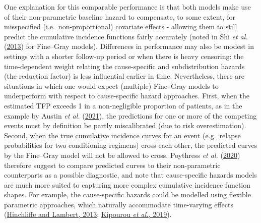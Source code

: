 \documentclass[
  letterpaper,
  DIV=11,
  numbers=noendperiod]{scrreprt}
\begin{document}
One explanation for this comparable performance is that both models make
use of their non-parametric baseline hazard to compensate, to some
extent, for misspecified (i.e.~non-proportional) covariate effects -
allowing them to still predict the cumulative incidence functions fairly
accurately (noted in Shi \emph{et al.}
(\protect\hyperlink{ref-shiConstrainedParametricModel2013}{2013}) for
Fine--Gray models). Differences in performance may also be modest in
settings with a shorter follow-up period or when there is heavy
censoring: the time-dependent weight relating the cause-specific and
subdistribution hazards (the reduction factor) is less influential
earlier in time. Nevertheless, there are situations in which one would
expect (multiple) Fine--Gray models to underperform with respect to
cause-specific hazard approaches. First, when the estimated TFP exceeds
1 in a non-negligible proportion of patients, as in the example by
Austin \emph{et al.}
(\protect\hyperlink{ref-austinFineGraySubdistributionHazard2021}{2021}),
the predictions for one or more of the competing events must by
definition be partly miscalibrated (due to risk overestimation). Second,
when the true cumulative incidence curves for an event (e.g.~relapse
probabilities for two conditioning regimens) cross each other, the
predicted curves by the Fine--Gray model will not be allowed to cross.
Poythress \emph{et al.}
(\protect\hyperlink{ref-poythressPlanningAnalyzingClinical2020a}{2020})
therefore suggest to compare predicted curves to their non-parametric
counterparts as a possible diagnostic, and note that cause-specific
hazards models are much more suited to capturing more complex cumulative
incidence function shapes. For example, the cause-specific hazards could
be modelled using flexible parametric approaches, which naturally
accommodate time-varying effects
(\protect\hyperlink{ref-hinchliffeFlexibleParametricModelling2013}{Hinchliffe
and Lambert, 2013};
\protect\hyperlink{ref-kipourouEstimationAdjustedCausespecific2019}{Kipourou
\emph{et al.}, 2019}).
\end{document}
